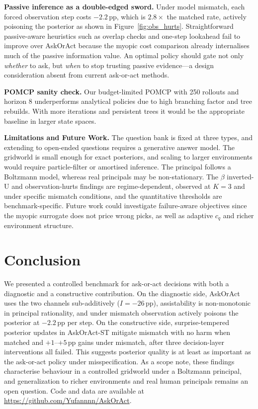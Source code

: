 \documentclass[10pt,twocolumn]{article}
\begin{document}
\textbf{Passive inference as a double-edged sword.}
Under model mismatch, each forced observation step costs $-2.2$\,pp, which is $2.8\times$ the matched rate, actively poisoning the posterior as shown in Figure~\ref{fig:obs_hurts}.
Straightforward passive-aware heuristics such as overlap checks and one-step lookahead fail to improve over AskOrAct because the myopic cost comparison already internalises much of the passive information value.
An optimal policy should gate not only \emph{whether} to ask, but \emph{when} to stop trusting passive evidence---a design consideration absent from current ask-or-act methods.

\textbf{POMCP sanity check.}
Our budget-limited POMCP with 250 rollouts and horizon 8 underperforms analytical policies due to high branching factor and tree rebuilds. With more iterations and persistent trees it would be the appropriate baseline in larger state spaces.

\textbf{Limitations and Future Work.}
The question bank is fixed at three types, and extending to open-ended questions requires a generative answer model.
The gridworld is small enough for exact posteriors, and scaling to larger environments would require particle-filter or amortised inference.
The principal follows a Boltzmann model, whereas real principals may be non-stationary.
The $\beta$ inverted-U and observation-hurts findings are regime-dependent, observed at $K{=}3$ and under specific mismatch conditions, and the quantitative thresholds are benchmark-specific.
Future work could investigate failure-aware objectives since the myopic surrogate does not price wrong picks, as well as adaptive $c_q$ and richer environment structure.

\section{Conclusion}

We presented a controlled benchmark for ask-or-act decisions with both a diagnostic and a constructive contribution.
On the diagnostic side, AskOrAct uses the two channels sub-additively ($I{=}-26$\,pp), assistability is non-monotonic in principal rationality, and under mismatch observation actively poisons the posterior at $-2.2$\,pp per step.
On the constructive side, surprise-tempered posterior updates in AskOrAct-ST mitigate mismatch with no harm when matched and $+1$--$+5$\,pp gains under mismatch, after three decision-layer interventions all failed.
This suggests posterior quality is at least as important as the ask-or-act policy under misspecification.
As a scope note, these findings characterise behaviour in a controlled gridworld under a Boltzmann principal, and generalization to richer environments and real human principals remains an open question.
Code and data are available at \url{https://github.com/Yufannnn/AskOrAct}.
\end{document}
